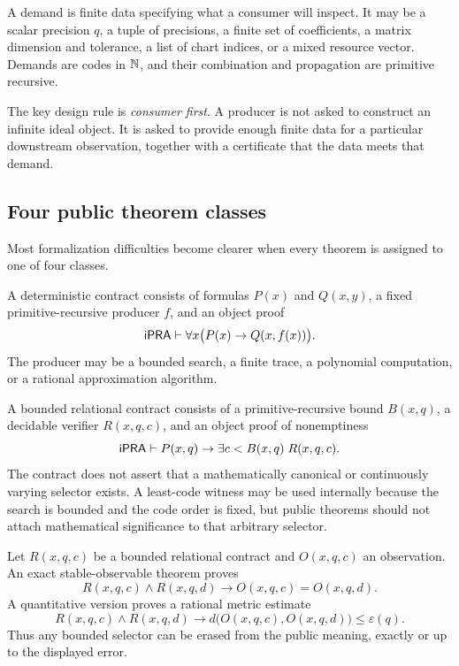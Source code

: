 \begin{definition}[Demand]
A demand is finite data specifying what a consumer will inspect.  It may be a scalar precision
\(q\), a tuple of precisions, a finite set of coefficients, a matrix dimension and tolerance, a list of
chart indices, or a mixed resource vector.  Demands are codes in \(\mathbb N\), and their combination and
propagation are primitive recursive.
\end{definition}

The key design rule is \emph{consumer first}.  A producer is not asked to construct an infinite ideal
object.  It is asked to provide enough finite data for a particular downstream observation, together with a
certificate that the data meets that demand.

\subsection{Four public theorem classes}

Most formalization difficulties become clearer when every theorem is assigned to one of four classes.

\begin{definition}
A deterministic contract consists of formulas \(P(x)\) and \(Q(x,y)\), a fixed primitive-recursive
producer \(f\), and an object proof
\[
  \mathsf{iPRA}\vdash \forall x\bigl(P(x)\to Q(x,f(x))\bigr).
\]
The producer may be a bounded search, a finite trace, a polynomial computation, or a rational
approximation algorithm.
\end{definition}

\begin{definition}
A bounded relational contract consists of a primitive-recursive bound \(B(x,q)\), a decidable verifier
\(R(x,q,c)\), and an object proof of nonemptiness
\[
  \mathsf{iPRA}\vdash P(x,q)\to\exists c<B(x,q)\;R(x,q,c).
\]
The contract does not assert that a mathematically canonical or continuously varying selector exists.
A least-code witness may be used internally because the search is bounded and the code order is fixed,
but public theorems should not attach mathematical significance to that arbitrary selector.
\end{definition}

\begin{definition}
Let \(R(x,q,c)\) be a bounded relational contract and \(O(x,q,c)\) an observation.
An exact stable-observable theorem proves
\[
 R(x,q,c)\wedge R(x,q,d)\to O(x,q,c)=O(x,q,d).
\]
A quantitative version proves a rational metric estimate
\[
 R(x,q,c)\wedge R(x,q,d)\to
 d\bigl(O(x,q,c),O(x,q,d)\bigr)\le \varepsilon(q).
\]
Thus any bounded selector can be erased from the public meaning, exactly or up to the displayed error.
\end{definition}

